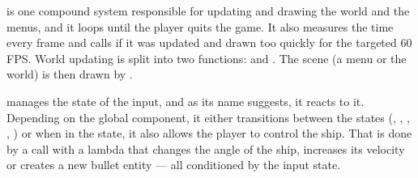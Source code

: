 \documentclass[
  digital, %
  color,   %
  table,   %
  oneside, %
  lof,     %
  lot,     %
]{fithesis3}
\begin{document}
 is one compound system responsible for updating and drawing
the world and the menus, and it loops until the player quits the game.
It also measures the time every frame and calls  if it was
updated and drawn too quickly for the targeted 60 FPS. World updating is split
into two functions:  and .
The scene (a menu or the world) is then drawn by .

 manages the state of the input, and as its name suggests,
it reacts to it. Depending on the global  component,
it either transitions between the states (, ,
, , ) or
when in the  state, it also allows the player to control the ship.
That is done by a  call with a lambda that changes the angle of the ship,
increases its velocity or creates a new bullet entity — all conditioned by the input state.
\end{document}
